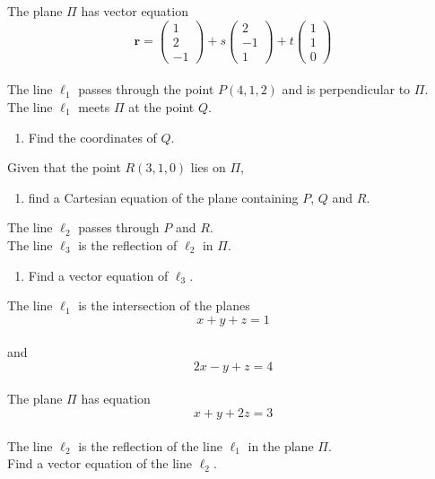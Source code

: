 \documentclass[leqno]{article}
\begin{document}
\begin{enumerate}[
  label=\textbf{\arabic*.},
  leftmargin=*,
  topsep=0pt,
  partopsep=0pt,
  parsep=0pt
]
The plane $\Pi$ has vector equation
\[
\mathbf{r}=\begin{pmatrix}1\\2\\-1\end{pmatrix}+s\begin{pmatrix}2\\-1\\1\end{pmatrix}+t\begin{pmatrix}1\\1\\0\end{pmatrix}
\] \\
The line $\ell_1$ passes through the point $P(4,1,2)$ and is perpendicular to $\Pi$. \\
The line $\ell_1$ meets $\Pi$ at the point $Q$. \\
\begin{enumerate}[label=\textbf{(\alph*)}]
  \item Find the coordinates of $Q$.  \\
\end{enumerate}
Given that the point $R(3,1,0)$ lies on $\Pi$, \\
\begin{enumerate}[label=\textbf{(\alph*)}, resume]
  \item find a Cartesian equation of the plane containing $P$, $Q$ and $R$.  \\
\end{enumerate}
The line $\ell_2$ passes through $P$ and $R$. \\
The line $\ell_3$ is the reflection of $\ell_2$ in $\Pi$. \\
\begin{enumerate}[label=\textbf{(\alph*)}, resume]
  \item Find a vector equation of $\ell_3$.  \\
\end{enumerate}

\newpage

\questionitem

The line $\ell_1$ is the intersection of the planes
\[
x+y+z=1
\] \\
and
\[
2x-y+z=4
\] \\
The plane $\Pi$ has equation
\[
x+y+2z=3
\] \\
The line $\ell_2$ is the reflection of the line $\ell_1$ in the plane $\Pi$. \\

Find a vector equation of the line $\ell_2$. 


\end{enumerate}
\end{document}
